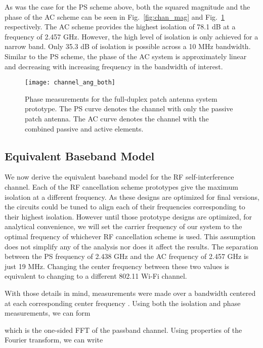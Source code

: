 \documentclass[12pt, journal,draftcls,letterpaper,onecolumn]{IEEEtran}
\begin{document}
As was the case for the PS scheme above, both the squared magnitude and the phase of the AC scheme can be seen in Fig.~\ref{fig:chan_mag} and Fig.~\ref{fig:chan_ang} respectively.  The AC scheme provides the highest isolation of 78.1 dB at a frequency of  2.457 GHz.  However, the high level of isolation is only achieved for a narrow band.  Only 35.3 dB of isolation is possible across a 10 MHz bandwidth.  Similar to the PS scheme, the phase of the AC system is approximately linear and decreasing with increasing frequency in the bandwidth of interest.  
\begin{figure}[htp]
\begin{center} 
  \texttt{[image: channel\_ang\_both]}
\caption[fig:chan_ang]{Phase measurements for the full-duplex patch antenna system prototype.  The PS curve denotes the channel with only the passive patch antenna.  The AC curve denotes the channel with the combined passive and active elements.} 
  \label{fig:chan_ang}
\end{center} 
\end{figure}   

\subsection{Equivalent Baseband Model}
We now derive the equivalent baseband model for the RF self-interference channel.  Each of the RF cancellation scheme prototypes give the maximum isolation at a different frequency.  As these designs are optimized for final versions, the circuits could be tuned to align each of their frequencies corresponding to their highest isolation.  However until those prototype designs are optimized, for analytical convenience, we will set the carrier frequency  of our system to the optimal frequency of whichever RF cancellation scheme is used.  This assumption does not simplify any of the analysis nor does it affect the results.  The separation between the PS frequency of 2.438 GHz and the AC frequency of 2.457 GHz is just 19 MHz.  Changing the center frequency  between these two values is equivalent to changing to a different 802.11 Wi-Fi channel.  

With those details in mind, measurements were made over a bandwidth  centered at each corresponding center frequency .  Using both the isolation and phase measurements, we can form

which is the one-sided FFT of the passband channel.  Using properties of the Fourier transform, we can write
\end{document}
